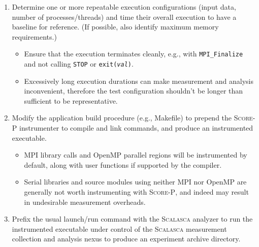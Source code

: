 \documentclass[a4paper]{article}
\newcommand{\Scalasca}{\textsc{Scalasca}\xspace}
\newcommand{\Scorep}{\textsc{Score-P}\xspace}
\begin{document}
\begin{enumerate}

\item Determine one or more repeatable execution configurations (input
data, number of processes/threads) and time their overall execution to
have a baseline for reference.  (If possible, also identify maximum
memory requirements.)  
\begin{itemize}
\item Ensure that the execution terminates cleanly, e.g., with
    \verb+MPI_Finalize+ and not calling \texttt{STOP} or
    \texttt{exit(\mbox{\rmfamily\itshape val})}.
\item Excessively long execution durations can make
measurement and analysis inconvenient, therefore the test configuration
shouldn't be longer than sufficient to be representative.
\end{itemize}

\item Modify the application build procedure (e.g., Makefile) to prepend the
\Scorep instrumenter to compile and link commands, and produce an
instrumented executable. 

\begin{itemize}
\item MPI library calls and OpenMP parallel regions will be instrumented by
default, along with user functions if supported by the compiler.
\item Serial libraries and source modules using neither MPI nor OpenMP
are generally not worth instrumenting with \Scorep, and indeed may result in
undesirable measurement overheads.
\end{itemize}

\item Prefix the usual launch/run command with the \Scalasca analyzer to
run the instrumented executable under control of the \Scalasca
measurement collection and analysis nexus to produce an experiment
archive directory.


\end{enumerate}
\end{document}
